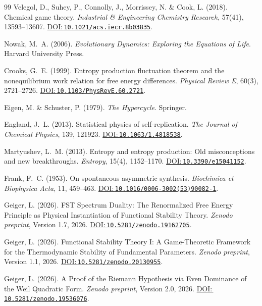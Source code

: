 \documentclass[12pt,a4paper]{article}
\newcommand{\doilink}[1]{\href{https://doi.org/#1}{DOI:\,\nolinkurl{#1}}}
\theoremstyle{remark}
\begin{document}
\begin{thebibliography}{99}
Velegol, D., Suhey, P., Connolly, J., Morrissey, N. \& Cook, L. (2018).
\newblock Chemical game theory.
\newblock \textit{Industrial \& Engineering Chemistry Research}, 57(41), 13593--13607.
\newblock \doilink{10.1021/acs.iecr.8b03835}.

Nowak, M.~A. (2006).
\newblock \textit{Evolutionary Dynamics: Exploring the Equations of Life}.
\newblock Harvard University Press.

Crooks, G.~E. (1999).
\newblock Entropy production fluctuation theorem and the nonequilibrium work relation for free energy differences.
\newblock \textit{Physical Review E}, 60(3), 2721--2726.
\newblock \doilink{10.1103/PhysRevE.60.2721}.

Eigen, M. \& Schuster, P. (1979).
\newblock \textit{The Hypercycle}.
\newblock Springer.

England, J.~L. (2013).
\newblock Statistical physics of self-replication.
\newblock \textit{The Journal of Chemical Physics}, 139, 121923.
\newblock \doilink{10.1063/1.4818538}.

Martyushev, L.~M. (2013).
\newblock Entropy and entropy production: Old misconceptions and new breakthroughs.
\newblock \textit{Entropy}, 15(4), 1152--1170.
\newblock \doilink{10.3390/e15041152}.


Frank, F.~C. (1953).
\newblock On spontaneous asymmetric synthesis.
\newblock \textit{Biochimica et Biophysica Acta}, 11, 459--463.
\newblock \doilink{10.1016/0006-3002(53)90082-1}.

Geiger, L. (2026).
\newblock FST Spectrum Duality: The Renormalized Free Energy Principle as Physical Instantiation of Functional Stability Theory.
\newblock \textit{Zenodo preprint}, Version 1.7, 2026.
\newblock \doilink{10.5281/zenodo.19162705}.

Geiger, L. (2026).
\newblock Functional Stability Theory I: A Game-Theoretic Framework for the Thermodynamic Stability of Fundamental Parameters.
\newblock \textit{Zenodo preprint}, Version 1.1, 2026.
\newblock \doilink{10.5281/zenodo.20130955}.

Geiger, L. (2026).
\newblock A Proof of the Riemann Hypothesis via Even Dominance of the Weil Quadratic Form.
\newblock \textit{Zenodo preprint}, Version 2.0, 2026.
\newblock \doilink{10.5281/zenodo.19536076}.


\end{thebibliography}
\end{document}

